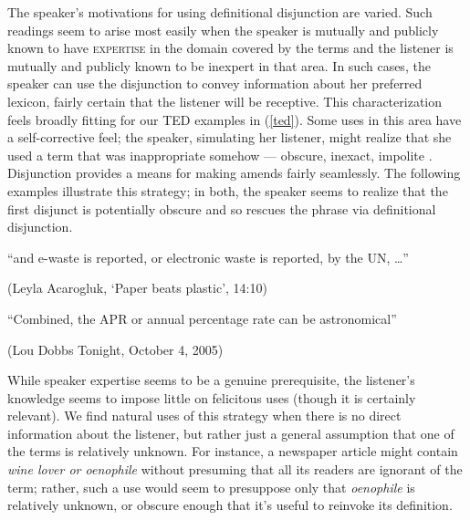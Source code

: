 \documentclass[12pt,twoside]{article}
\newcommand{\eg}[1]{(\ref{#1})}
\newcommand{\word}[1]{\emph{#1}}
\renewcommand{\_}{\textbf{\textunderscore\hspace{-4pt}\textunderscore\hspace{-3pt}\textunderscore\hspace{-4pt}\textunderscore}\hspace{0.5pt}}			%
\newcommand{\technicalTerm}[1]{\textsc{#1}}
\begin{document}
The speaker's motivations for using definitional disjunction are
varied. Such readings seem to arise most easily when the speaker is
mutually and publicly known to have \technicalTerm{expertise} in the
domain covered by the terms and the listener is mutually and publicly
known to be inexpert in that area. In such cases, the speaker can use
the disjunction to convey information about her preferred lexicon,
fairly certain that the listener will be receptive. This
characterization feels broadly fitting for our TED examples in
\eg{ted}. Some uses in this area have a self-corrective feel; the
speaker, simulating her listener, might realize that she used a term
that was inappropriate somehow --- obscure, inexact, impolite
\citep{Clark:1994,Clark:Krych:2004}. Disjunction provides a means for
making amends fairly seamlessly. The following examples illustrate
this strategy; in both, the speaker seems to realize that the first
disjunct is potentially obscure and so rescues the phrase via
definitional disjunction.
%
\begin{exe}
  \ex\label{corrections}
  \begin{xlist}
    \ex\label{TED-correction} ``and e-waste is reported, or electronic
    waste is reported, by the UN, \ldots''

    (Leyla Acarogluk, `Paper beats plastic', 14:10)

    \ex\label{CNN-correction} ``Combined, the APR or annual
    percentage rate can be astronomical''

    (Lou Dobbs Tonight, October 4, 2005)
  \end{xlist}
\end{exe}

While speaker expertise seems to be a genuine prerequisite, the
listener's knowledge seems to impose little on felicitous uses (though
it is certainly relevant). We find natural uses of this strategy when
there is no direct information about the listener, but rather just a
general assumption that one of the terms is relatively unknown. For
instance, a newspaper article might contain \word{wine lover or
  oenophile} without presuming that all its readers are ignorant of
the term; rather, such a use would seem to presuppose only that
\word{oenophile} is relatively unknown, or obscure enough that it's
useful to reinvoke its definition.
\end{document}
